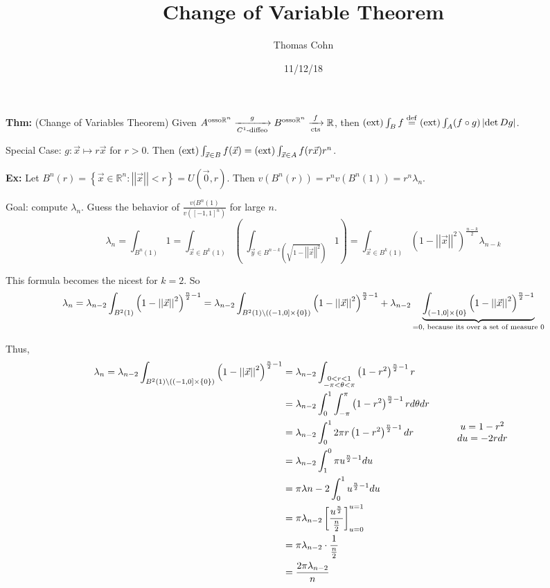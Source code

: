 \documentclass[10pt,letterpaper]{article}
\author{Thomas Cohn}
\title{Change of Variable Theorem}
\date{11/12/18} %
\newcommand{\n}{\hfill\break}
\newcommand{\thm}[1]{\par\noindent\settowidth{\hangindent}{\textbf{Thm: }}\textbf{Thm: }#1\n}
\newcommand{\ex}[1]{\par\noindent\settowidth{\hangindent}{\textbf{Ex: }}\textbf{Ex: }#1\n}
\newcommand{\ptxt}[1]{\textrm{\textnormal{#1}}}
\newcommand{\set}[1]{\left\{#1\right\}}
\newcommand{\reals}{\mathbb{R}}
\newcommand{\R}{\reals}
\newcommand{\cut}{\setminus}
\newcommand{\abs}[1]{\left|#1\right|}
\newcommand{\of}{\circ}
\newcommand{\norm}[1]{\abs{\abs{#1}}}
\newcommand{\paren}[1]{\left(#1\right)}
\renewcommand{\brack}[1]{\left[#1\right]}
\begin{document}
\maketitle
\setlength\RaggedRightParindent{\parindent}
\RaggedRight

\thm{(Change of Variables Theorem) Given $A^{\ptxt{osso}\R^{n}}\xrightarrow[C^{1}\ptxt{-diffeo}]{g}B^{\ptxt{osso}\R^{n}}\xrightarrow[\ptxt{cts}]{f}\R$, then $(\ptxt{ext})\int_{B}f\overset{\ptxt{def}}{=}(\ptxt{ext})\int_{A}(f\of{}g)\abs{\det{}Dg}$.}

\par\noindent Special Case: $g:\vec{x}\mapsto{}r\vec{x}$ for $r>0$. Then $(\ptxt{ext})\int_{\vec{x}\in{}B}f(\vec{x})=(\ptxt{ext})\int_{\vec{x}\in{}A}f(r\vec{x})r^{n}$.\n

\ex{Let $B^{n}(r)=\set{\vec{x}\in\R^{n}:\norm{\vec{x}}<r}=U(\vec{0},r)$.\n
Then $v(B^{n}(r))=r^{n}v(B^{n}(1))=r^{n}\lambda_{n}$.}

\par\noindent Goal: compute $\lambda_{n}$. Guess the behavior of $\frac{v(B^{n}(1)}{v([-1,1]^{n})}$ for large $n$.
\[
\lambda_{n}=\int_{B^{n}(1)}1=\int_{\vec{x}\in{}B^{k}(1)}\paren{\;\int_{\vec{y}\in{}B^{n-k}(\sqrt{1-\norm{\vec{x}}^{2}})}1}=\int_{\vec{x}\in{}B^{k}(1)}\paren{1-\norm{\vec{x}}^{2}}^{\frac{n-k}{2}}\lambda_{n-k}
\]

\par\noindent This formula becomes the nicest for $k=2$. So
\[
\lambda_{n}=\lambda_{n-2}\int_{B^{2}(1)}\paren{1-\norm{\vec{x}}^{2}}^{\frac{n}{2}-1}=\lambda_{n-2}\int_{B^{2}(1)\cut((-1,0]\times\set{0})}\paren{1-\norm{\vec{x}}^{2}}^{\frac{n}{2}-1}+\lambda_{n-2}\underbrace{\int_{(-1,0]\times\set{0}}\paren{1-\norm{\vec{x}}^{2}}^{\frac{n}{2}-1}}_{=0\ptxt{, because its over a set of measure $0$}}
\]

\par\noindent Thus,
\begin{align*}
\lambda_{n}=\lambda_{n-2}\int_{B^{2}(1)\cut((-1,0]\times\set{0})}\paren{1-\norm{\vec{x}}^{2}}^{\frac{n}{2}-1} & =\lambda_{n-2}\int_{\begin{subarray}{c}0<r<1\\ -\pi<\theta<\pi\end{subarray}}\paren{1-r^{2}}^{\frac{n}{2}-1}r\\
 & =\lambda_{n-2}\int_{0}^{1}\int_{-\pi}^{\pi}\paren{1-r^{2}}^{\frac{n}{2}-1}rd\theta{}dr\\
 & =\lambda_{n-2}\int_{0}^{1}2\pi{}r\paren{1-r^{2}}^{\frac{n}{2}-1}dr\qquad\qquad\begin{array}{c}u=1-r^{2}\\ du=-2rdr\end{array}\\
 & =\lambda_{n-2}\int_{1}^{0}\pi{}u^{\frac{n}{2}-1}du\\
 & =\pi\lambda{n-2}\int_{0}^{1}u^{\frac{n}{2}-1}du\\
 & =\pi\lambda_{n-2}\brack{\frac{u^{\frac{n}{2}}}{\frac{n}{2}}}_{u=0}^{u=1}\\
 & =\pi\lambda_{n-2}\cdot\frac{1}{\frac{n}{2}}\\
 & =\frac{2\pi\lambda_{n-2}}{n}
\end{align*}
\end{document}
